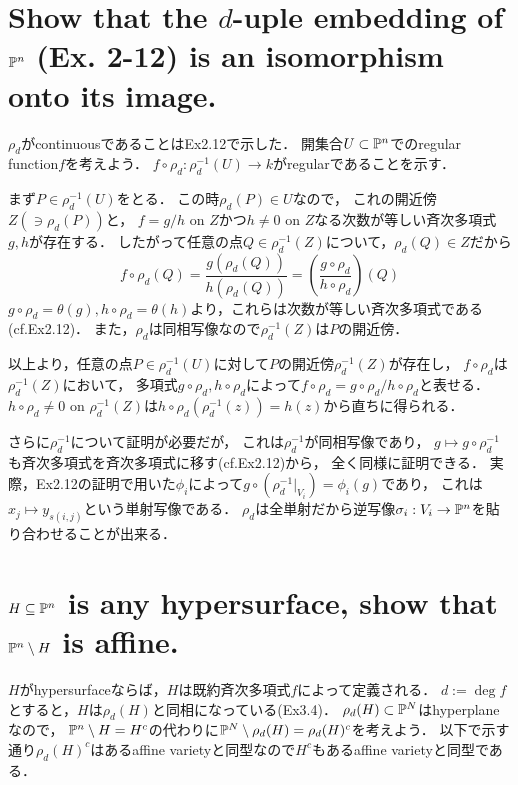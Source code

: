 \documentclass[a4paper]{jarticle}
\begin{document}
\section{Show that the $d$-uple embedding of $\mathbb{P}^n$ (Ex. 2-12) is an isomorphism onto its image.} %
    $\rho_d$がcontinuousであることはEx2.12で示した．
    開集合$U \subset \mathbb{P}^n$でのregular function$f$を考えよう．
    $f \circ \rho_d: \rho_d^{-1}(U) \to k$がregularであることを示す．

    まず$P \in \rho_d^{-1}(U)$をとる．
    この時$\rho_d(P) \in U$なので，
    これの開近傍$Z( \ni \rho_d(P))$と，
    $f=g/h$ on $Z$かつ$h \neq 0$ on $Z$なる次数が等しい斉次多項式$g,h$が存在する．
    したがって任意の点$Q \in \rho_d^{-1}(Z)$について，$\rho_d(Q) \in Z$だから
    \[ f \circ \rho_d(Q)=\frac{g(\rho_d(Q))}{h(\rho_d(Q))}=\left( \frac{g \circ \rho_d}{h \circ \rho_d} \right)(Q) \]
    $g \circ \rho_d=\theta(g), h \circ \rho_d=\theta(h)$より，これらは次数が等しい斉次多項式である(cf.Ex2.12)．
    また，$\rho_d$は同相写像なので$\rho_d^{-1}(Z)$は$P$の開近傍．

    以上より，任意の点$P \in \rho_d^{-1}(U)$に対して$P$の開近傍$\rho_d^{-1}(Z)$が存在し，
    $f \circ \rho_d$は$\rho_d^{-1}(Z)$において，
    多項式$g \circ \rho_d, h \circ \rho_d$によって$f \circ \rho_d=g \circ \rho_d/h \circ \rho_d$と表せる．
    $h \circ \rho_d \neq 0$ on $\rho_d^{-1}(Z)$は$h \circ \rho_d(\rho_d^{-1}(z))=h(z)$から直ちに得られる．

    さらに$\rho_d^{-1}$について証明が必要だが，
    これは$\rho_d^{-1}$が同相写像であり，
    $g \mapsto g \circ \rho_d^{-1}$も斉次多項式を斉次多項式に移す(cf.Ex2.12)から，
    全く同様に証明できる．
    実際，Ex2.12の証明で用いた$\phi_i$によって$g \circ (\rho_d^{-1}|_{V_i})=\phi_i(g)$であり，
    これは$x_j \mapsto y_{s(i,j)}$という単射写像である．
    $\rho_d$は全単射だから逆写像$\sigma_i:V_i \to \mathbb{P}^n$を貼り合わせることが出来る．

\section{$H \subseteq \mathbb{P}^n$ is any hypersurface, show that $\mathbb{P}^n \setminus H$ is affine.} %
    $H$がhypersurfaceならば，$H$は既約斉次多項式$f$によって定義される．
    $d:=\deg f$とすると，$H$は$\rho_d(H)$と同相になっている(Ex3.4)．
    $\rho_d(H) \subset \mathbb{P}^N$はhyperplaneなので，
    $\mathbb{P}^n \setminus H=H^c$の代わりに$\mathbb{P}^N \setminus \rho_d(H)=\rho_d(H)^c$を考えよう．
    以下で示す通り$\rho_d(H)^c$はあるaffine varietyと同型なので$H^c$もあるaffine varietyと同型である．
\end{document}
